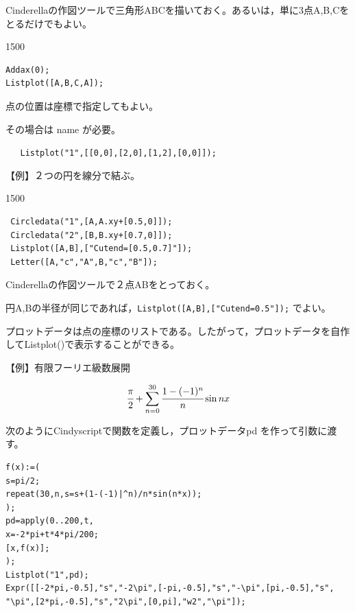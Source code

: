 \documentclass[papersize,a4paper,12pt,uplatex]{jsarticle}
\begin{document}
\begin{description}
Cinderellaの作図ツールで三角形ABCを描いておく。あるいは，単に3点A,B,Cをとるだけでもよい。

\begin{layer}{150}{0}
\end{layer}
\hspace{20mm}

\begin{verbatim}
Addax(0);
Listplot([A,B,C,A]);
\end{verbatim}

点の位置は座標で指定してもよい。

その場合は name が必要。

\verb|   Listplot("1",[[0,0],[2,0],[1,2],[0,0]]);|

\vspace{\baselineskip}
【例】２つの円を線分で結ぶ。

\begin{layer}{150}{0}
\end{layer}
\hspace{20mm}

\begin{verbatim}
 Circledata("1",[A,A.xy+[0.5,0]]);
 Circledata("2",[B,B.xy+[0.7,0]]);
 Listplot([A,B],["Cutend=[0.5,0.7]"]);
 Letter([A,"c","A",B,"c","B"]);
\end{verbatim}
Cinderellaの作図ツールで２点ABをとっておく。

円A,Bの半径が同じであれば，\verb|Listplot([A,B],["Cutend=0.5"]);| でよい。

\vspace{\baselineskip}
プロットデータは点の座標のリストである。したがって，プロットデータを自作してListplot()で表示することができる。

\vspace{\baselineskip}
【例】有限フーリエ級数展開

 \[\cfrac{\pi}{2}+\sum_{n=0}^{30} \cfrac{1-(-1)^n}{n}\sin nx\]

次のようにCindyscriptで関数を定義し，プロットデータpd を作って引数に渡す。
\begin{verbatim}
f(x):=(
s=pi/2;
repeat(30,n,s=s+(1-(-1)|^n)/n*sin(n*x));
);
pd=apply(0..200,t,
x=-2*pi+t*4*pi/200;
[x,f(x)];
);
Listplot("1",pd);
Expr([[-2*pi,-0.5],"s","-2\pi",[-pi,-0.5],"s","-\pi",[pi,-0.5],"s",
"\pi",[2*pi,-0.5],"s","2\pi",[0,pi],"w2","\pi"]);
\end{verbatim}

\vspace{\baselineskip}
\hspace{20mm}


\end{description}
\end{document}
